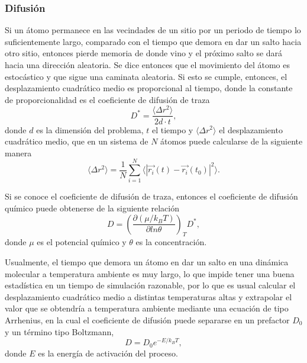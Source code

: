 \subsubsection{Difusión}

Si un átomo permanece en las vecindades de un sitio por un periodo de tiempo lo 
suficientemente largo, comparado con el tiempo que demora en dar un salto hacia otro
sitio, entonces pierde memoria de donde vino y el próximo salto se dará hacia 
una dirección aleatoria. Se dice entonces que el movimiento del átomo es 
estocástico y que sigue una caminata aleatoria. Si esto se cumple, entonces, el 
desplazamiento cuadrático medio es proporcional al tiempo, donde la constante de 
proporcionalidad es el coeficiente de difusión de traza
\begin{equation}
    D^{*} = \frac{\langle \Delta r^2 \rangle}{2d\cdot t},
\end{equation}
donde $d$ es la dimensión del problema, $t$ el tiempo y 
$\langle \Delta r^2 \rangle$ el desplazamiento cuadrático medio, que en un 
sistema de $N$ átomos puede calcularse de la siguiente manera
\begin{equation}
    \langle \Delta r^2 \rangle = \frac{1}{N} \sum_{i=1}^{N} \langle |\vec{r_i}(t) - \vec{r_i}(t_0)|^2 \rangle.
\end{equation}

Si se conoce el coeficiente de difusión de traza, entonces el coeficiente de 
difusión químico puede obtenerse de la siguiente relación ~\cite{gomer1990}
\begin{equation}
    D = \left( \frac{\partial (\mu / k_BT)}{\partial ln \theta} \right)_T D^{*},
\end{equation}
donde $\mu$ es el potencial químico y $\theta$ es la concentración.

Usualmente, el tiempo que demora un átomo en dar un salto en una dinámica 
molecular a temperatura ambiente es muy largo, lo que impide tener una buena 
estadística en un tiempo de simulación razonable, por lo que es usual calcular 
el desplazamiento cuadrático medio a distintas temperaturas altas y extrapolar
el valor que se obtendría a temperatura ambiente mediante una ecuación de tipo 
Arrhenius, en la cual el coeficiente de difusión puede separarse en un 
prefactor $D_0$ y un término tipo Boltzmann,
\begin{equation}
    D = D_0 e^{-E / k_BT},
\end{equation}
donde $E$ es la energía de activación del proceso. 
